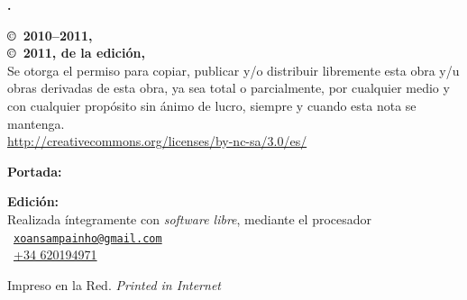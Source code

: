 \noindent
\textbf{\titlename. \subtitlename}\\
\authorname

\footnotesize

\bigskip\bigskip\noindent
\textbf{\copyright\ 2010--2011, \authorname}\\
\textbf{\copyright\ 2011, de la edición, \editorname}\\
Se otorga el permiso para copiar, publicar y/o distribuir libremente esta obra y/u obras derivadas de esta obra, ya sea total o parcialmente, por cualquier medio y con cualquier propósito sin ánimo de lucro, siempre y cuando esta nota se mantenga.\\
{\selectfont\url{http://creativecommons.org/licenses/by-nc-sa/3.0/es/}}

\normalsize

\noindent\ccbyncsaeu

\footnotesize

\bigskip\noindent
\textbf{Portada:} \coverauthorname

\bigskip\noindent
\textbf{Edición:} \editorname\\
Realizada íntegramente con \emph{software libre}, mediante el procesador \LaTeXe\\
\Letter\ {\selectfont\href{mailto:xoansampainho@gmail.com}{\nolinkurl{xoansampainho@gmail.com}}}\\
\Telefon\ \href{callto:+34620194971}{+34 620194971}

\bigskip\noindent
Impreso en la Red. \emph{Printed in Internet}

\normalsize

\endinput
